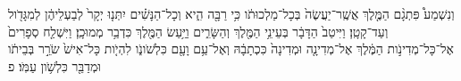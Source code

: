 \documentclass{openreader}
\begin{document}
וְנִשְׁמַע֩ פִּתְגָ֨ם הַמֶּ֤לֶךְ אֲשֶֽׁר־יַעֲשֶׂה֙ בְּכָל־מַלְכוּתֹ֔ו כִּ֥י רַבָּ֖ה הִ֑יא וְכָל־הַנָּשִׁ֗ים יִתְּנ֤וּ יְקָר֙ לְבַעְלֵיהֶ֔ן לְמִגָּדֹ֖ול וְעַד־קָטָֽן׃ 
וַיִּיטַב֙ הַדָּבָ֔ר בְּעֵינֵ֥י הַמֶּ֖לֶךְ וְהַשָּׂרִ֑ים וַיַּ֥עַשׂ הַמֶּ֖לֶךְ כִּדְבַ֥ר מְמוּכָֽן׃ 
וַיִּשְׁלַ֤ח סְפָרִים֙ אֶל־כָּל־מְדִינֹ֣ות הַמֶּ֔לֶךְ אֶל־מְדִינָ֤ה וּמְדִינָה֙ כִּכְתָבָ֔הּ וְאֶל־עַ֥ם וָעָ֖ם כִּלְשֹׁונֹ֑ו לִהְיֹ֤ות כָּל־אִישׁ֙ שֹׂרֵ֣ר בְּבֵיתֹ֔ו וּמְדַבֵּ֖ר כִּלְשֹׁ֥ון עַמֹּֽו׃ פ 
\end{document}
